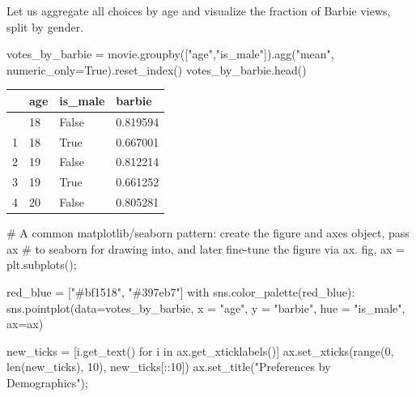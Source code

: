 \documentclass[
  letterpaper,
  DIV=11,
  numbers=noendperiod]{scrreprt}
\newenvironment{Shaded}{\begin{snugshade}}{\end{snugshade}}
\newcommand{\BuiltInTok}[1]{\textcolor[rgb]{0.00,0.23,0.31}{#1}}
\newcommand{\CommentTok}[1]{\textcolor[rgb]{0.37,0.37,0.37}{#1}}
\newcommand{\ControlFlowTok}[1]{\textcolor[rgb]{0.00,0.23,0.31}{#1}}
\newcommand{\DecValTok}[1]{\textcolor[rgb]{0.68,0.00,0.00}{#1}}
\newcommand{\KeywordTok}[1]{\textcolor[rgb]{0.00,0.23,0.31}{#1}}
\newcommand{\NormalTok}[1]{\textcolor[rgb]{0.00,0.23,0.31}{#1}}
\newcommand{\OperatorTok}[1]{\textcolor[rgb]{0.37,0.37,0.37}{#1}}
\newcommand{\StringTok}[1]{\textcolor[rgb]{0.13,0.47,0.30}{#1}}
\newcommand{\VariableTok}[1]{\textcolor[rgb]{0.07,0.07,0.07}{#1}}
\begin{document}
Let us aggregate all choices by age and visualize the fraction of Barbie
views, split by gender.

\begin{Shaded}
\begin{Highlighting}[]
\NormalTok{votes\_by\_barbie }\OperatorTok{=}\NormalTok{ movie.groupby([}\StringTok{"age"}\NormalTok{,}\StringTok{"is\_male"}\NormalTok{]).agg(}\StringTok{"mean"}\NormalTok{, numeric\_only}\OperatorTok{=}\VariableTok{True}\NormalTok{).reset\_index()}
\NormalTok{votes\_by\_barbie.head()}
\end{Highlighting}
\end{Shaded}

\begin{longtable}[]{@{}llll@{}}
\toprule\noalign{}
& age & is\_male & barbie \\
\midrule\noalign{}
\endhead
\bottomrule\noalign{}
\endlastfoot
0 & 18 & False & 0.819594 \\
1 & 18 & True & 0.667001 \\
2 & 19 & False & 0.812214 \\
3 & 19 & True & 0.661252 \\
4 & 20 & False & 0.805281 \\
\end{longtable}

\begin{Shaded}
\begin{Highlighting}[]
\CommentTok{\# A common matplotlib/seaborn pattern: create the figure and axes object, pass ax}
\CommentTok{\# to seaborn for drawing into, and later fine{-}tune the figure via ax.}
\NormalTok{fig, ax }\OperatorTok{=}\NormalTok{ plt.subplots()}\OperatorTok{;}

\NormalTok{red\_blue }\OperatorTok{=}\NormalTok{ [}\StringTok{"\#bf1518"}\NormalTok{, }\StringTok{"\#397eb7"}\NormalTok{]}
\ControlFlowTok{with}\NormalTok{ sns.color\_palette(red\_blue):}
\NormalTok{    sns.pointplot(data}\OperatorTok{=}\NormalTok{votes\_by\_barbie, x }\OperatorTok{=} \StringTok{"age"}\NormalTok{, y }\OperatorTok{=} \StringTok{"barbie"}\NormalTok{, hue }\OperatorTok{=} \StringTok{"is\_male"}\NormalTok{, ax}\OperatorTok{=}\NormalTok{ax)}

\NormalTok{new\_ticks }\OperatorTok{=}\NormalTok{ [i.get\_text() }\ControlFlowTok{for}\NormalTok{ i }\KeywordTok{in}\NormalTok{ ax.get\_xticklabels()]}
\NormalTok{ax.set\_xticks(}\BuiltInTok{range}\NormalTok{(}\DecValTok{0}\NormalTok{, }\BuiltInTok{len}\NormalTok{(new\_ticks), }\DecValTok{10}\NormalTok{), new\_ticks[::}\DecValTok{10}\NormalTok{])}
\NormalTok{ax.set\_title(}\StringTok{"Preferences by Demographics"}\NormalTok{)}\OperatorTok{;}
\end{Highlighting}
\end{Shaded}
\end{document}
